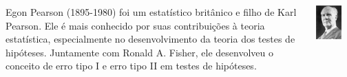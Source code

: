 \documentclass[12pt]{beamer}
\begin{document}
\begin{frame}{}
	\begin{block}{}
		\begin{columns} %
			
			\begin{column}{0.6\textwidth} %
				\vfill
				\centering
				\justifying
				Egon Pearson (1895-1980) foi um estatístico britânico e filho de Karl Pearson. Ele é mais conhecido por suas contribuições à teoria estatística, especialmente no desenvolvimento da teoria dos testes de hipóteses. Juntamente com Ronald A. Fisher, ele desenvolveu o conceito de erro tipo I e erro tipo II em testes de hipóteses. 
			\end{column}
			
			\begin{column}{0.3\textwidth} %
				\includegraphics[width=0.7\textwidth]{figs/Pearson.jpeg} %
			\end{column}
			
		\end{columns}
	\end{block}
\end{frame}
\end{document}
